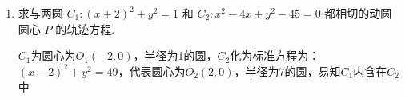 \begin{enumerate}
\begin{jieda}
\begin{enumerate}
\begin{enumerate}
                \item 待定系数法 \\
                因为椭圆的焦点在 $y$ 轴上,设所求椭圆的标准方程为 $\dfrac{{y}^{2}}{{a}^{2}} + \dfrac{{x}^{2}}{{b}^{2}} = 1\left( {a > b > 0}\right)$ . 由题意,得 $\left\{  \begin{array}{l} \dfrac{16}{{b}^{2}} + \dfrac{18}{{a}^{2}} = 1, \\  {a}^{2} - {b}^{2} = 4, \end{array}\right.$ 解得 $\left\{  \begin{array}{l} {a}^{2} = {36}, \\  {b}^{2} = {32}. \end{array}\right.$ 故所求椭圆的标准方程为 $\dfrac{{y}^{2}}{36} + \dfrac{{x}^{2}}{32} = 1$ . \\
                \ps 定义法好处在于思路直接，但问题在于求距离开方不利于手算，有计算器的情况下，困难不大；而待定系数法运算步骤更多一些.
            \end{enumerate}
        \item 设所求椭圆的方程为 $A{x}^{2} + B{y}^{2} = 1$ ,其中 $A > 0,B > 0,A \neq  B$ . \\
        代入题干中两个点的坐标可得 $\left\{  \begin{array}{l} {3A} + {4B} = 1, \\  {12A} + B = 1, \end{array}\right.$ 解得 $\left\{  \begin{array}{l} A = \dfrac{1}{15}, \\  B = \dfrac{1}{5}. \end{array}\right.$ 故所求椭圆的标准方程为 $\dfrac{{x}^{2}}{15} + \dfrac{{y}^{2}}{5} = 1$ \\
        \ps 当不知道椭圆焦点在$x$轴还是$y$轴上时，总是可以将椭圆方程设为$A{x}^{2} + B{y}^{2} = 1$ 
        \end{enumerate}
    \end{jieda}
    \item 求与两圆 ${C}_{1} : {\left( x + 2\right) }^{2} + {y}^{2} = 1$ 和 ${C}_{2} : {x}^{2} - {4x} + {y}^{2} - {45} = 0$ 都相切的动圆圆心 $P$ 的轨迹方程.
    \begin{jieda}
        $C_1$为圆心为$O_1(-2, 0)$，半径为1的圆，$C_2$化为标准方程为：$(x-2)^2+y^2 = 49$，代表圆心为$O_2(2, 0)$，半径为$7$的圆，易知$C_1$内含在$C_2$中
\end{jieda}
\end{enumerate}
